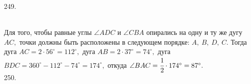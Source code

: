 \documentclass[12pt]{article}
\begin{document}
249. \begin{figure}[ht!]
\end{figure}\\
Для того, чтобы равные углы $\angle ADC$ и $\angle CBA$ опирались на одну и ту же дугу $AC,$ точки должны быть расположены в следующем порядке: $A,\ B,\ D,\ C.$ Тогда дуга $AC=2\cdot 56^\circ=112^\circ,$ дуга $AB=2\cdot37^\circ=74^\circ,$ дуга $BDC=360^\circ-112^\circ-74^\circ=174^\circ,$ откуда $\angle BAC=\cfrac{1}{2}\cdot 174^\circ=87^\circ.$\\
250. \begin{figure}[ht!]
\end{figure}\\
\end{document}
